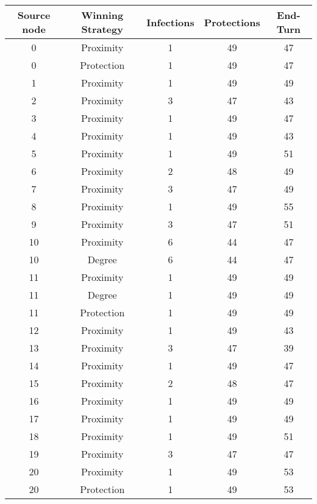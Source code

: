 \documentclass[results.tex]{subfiles}
\begin{document}
\begin{center}
  \begin{tabular}{| c || c | c | c | c |}
    \hline
    {\bfseries Source node} & {\bfseries Winning Strategy} & {\bfseries Infections} & {\bfseries Protections} & {\bfseries End-Turn} \\  %
    \hline\hline
    0 & Proximity & 1 & 49 & 47 \\ 
    \hline
    0 & Protection & 1 & 49 & 47 \\ 
    \hline
    1 & Proximity & 1 & 49 & 49 \\ 
    \hline
    2 & Proximity & 3 & 47 & 43 \\ 
    \hline
    3 & Proximity & 1 & 49 & 47 \\ 
    \hline
    4 & Proximity & 1 & 49 & 43 \\ 
    \hline
    5 & Proximity & 1 & 49 & 51 \\ 
    \hline
    6 & Proximity & 2 & 48 & 49 \\ 
    \hline
    7 & Proximity & 3 & 47 & 49 \\ 
    \hline
    8 & Proximity & 1 & 49 & 55 \\ 
    \hline
    9 & Proximity & 3 & 47 & 51 \\ 
    \hline
    10 & Proximity & 6 & 44 & 47 \\ 
    \hline
    10 & Degree & 6 & 44 & 47 \\ 
    \hline
    11 & Proximity & 1 & 49 & 49 \\ 
    \hline
    11 & Degree & 1 & 49 & 49 \\ 
    \hline
    11 & Protection & 1 & 49 & 49 \\ 
    \hline
    12 & Proximity & 1 & 49 & 43 \\ 
    \hline
    13 & Proximity & 3 & 47 & 39 \\ 
    \hline
    14 & Proximity & 1 & 49 & 47 \\ 
    \hline
    15 & Proximity & 2 & 48 & 47 \\ 
    \hline
    16 & Proximity & 1 & 49 & 49 \\ 
    \hline
    17 & Proximity & 1 & 49 & 49 \\ 
    \hline
    18 & Proximity & 1 & 49 & 51 \\ 
    \hline
    19 & Proximity & 3 & 47 & 47 \\ 
    \hline
    20 & Proximity & 1 & 49 & 53 \\ 
    \hline
    20 & Protection & 1 & 49 & 53 \\ 

\end{tabular}
\end{center}
\end{document}
